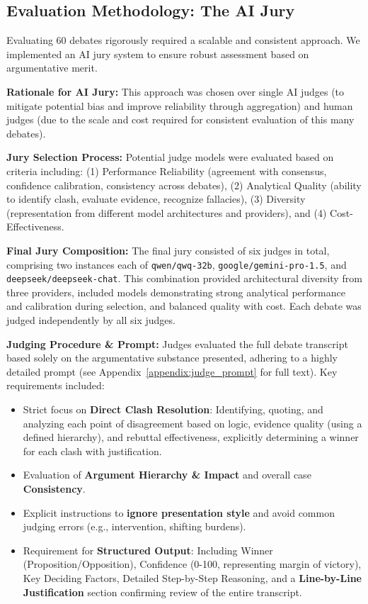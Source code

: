 \documentclass{article}
\begin{document}
\subsection{Evaluation Methodology: The AI Jury}
\label{appendix:ai_jury}

Evaluating 60 debates rigorously required a scalable and consistent approach. We implemented an AI jury system to ensure robust assessment based on argumentative merit.

\textbf{Rationale for AI Jury:} This approach was chosen over single AI judges (to mitigate potential bias and improve reliability through aggregation) and human judges (due to the scale and cost required for consistent evaluation of this many debates).

\textbf{Jury Selection Process:} Potential judge models were evaluated based on criteria including: (1) Performance Reliability (agreement with consensus, confidence calibration, consistency across debates), (2) Analytical Quality (ability to identify clash, evaluate evidence, recognize fallacies), (3) Diversity (representation from different model architectures and providers), and (4) Cost-Effectiveness.

\textbf{Final Jury Composition:} The final jury consisted of six judges in total, comprising two instances each of \texttt{qwen/qwq-32b}, \texttt{google/gemini-pro-1.5}, and \texttt{deepseek/deepseek-chat}. This combination provided architectural diversity from three providers, included models demonstrating strong analytical performance and calibration during selection, and balanced quality with cost. Each debate was judged independently by all six judges.



\textbf{Judging Procedure \& Prompt:} Judges evaluated the full debate transcript based solely on the argumentative substance presented, adhering to a highly detailed prompt (see Appendix~\ref{appendix:judge_prompt} for full text). Key requirements included:
\begin{itemize}
    \item Strict focus on \textbf{Direct Clash Resolution}: Identifying, quoting, and analyzing each point of disagreement based on logic, evidence quality (using a defined hierarchy), and rebuttal effectiveness, explicitly determining a winner for each clash with justification.
    \item Evaluation of \textbf{Argument Hierarchy \& Impact} and overall case \textbf{Consistency}.
    \item Explicit instructions to \textbf{ignore presentation style} and avoid common judging errors (e.g., intervention, shifting burdens).
    \item Requirement for \textbf{Structured Output}: Including Winner (Proposition/Opposition), Confidence (0-100, representing margin of victory), Key Deciding Factors, Detailed Step-by-Step Reasoning, and a \textbf{Line-by-Line Justification} section confirming review of the entire transcript.
\end{itemize}
\end{document}
